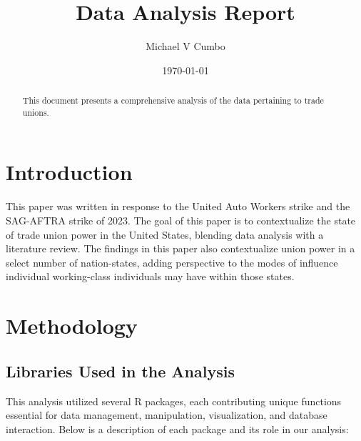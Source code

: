 \documentclass[11pt]{article}\usepackage[]{graphicx}\usepackage[]{xcolor}
\title{Data Analysis Report}
\author{Michael V Cumbo}
\date{\today}
\begin{document}
\maketitle

\begin{abstract}
This document presents a comprehensive analysis of the data pertaining to trade unions.
\end{abstract}

\section{Introduction}
This paper was written in response to the United Auto Workers strike and the SAG-AFTRA strike of 2023. The goal of this paper is to contextualize the state of trade union power in the United States, blending data analysis with a literature review. The findings in this paper also contextualize union power in a select number of nation-states, adding perspective to the modes of influence individual working-class individuals may have within those states.

\section{Methodology}
\subsection*{Libraries Used in the Analysis}

This analysis utilized several R packages, each contributing unique functions essential for data management, manipulation, visualization, and database interaction. Below is a description of each package and its role in our analysis:
\end{document}
